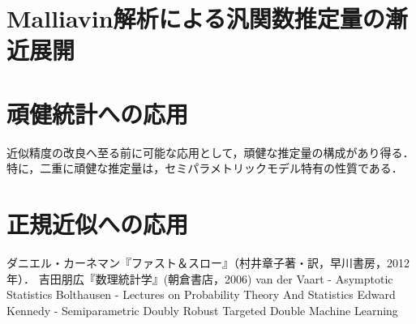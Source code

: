 \documentclass[uplatex, dvipdfmx]{jsarticle}
\begin{document}
\section{Malliavin解析による汎関数推定量の漸近展開}

\section{頑健統計への応用}

\begin{tcolorbox}[colframe=ForestGreen, colback=ForestGreen!10!white,breakable,colbacktitle=ForestGreen!40!white,coltitle=black,fonttitle=\bfseries\sffamily,
title=]
    近似精度の改良へ至る前に可能な応用として，頑健な推定量の構成があり得る．特に，二重に頑健な推定量は，セミパラメトリックモデル特有の性質である．
\end{tcolorbox}

\section{正規近似への応用}

\begin{thebibliography}{99}
    ダニエル・カーネマン『ファスト＆スロー』（村井章子著・訳，早川書房，2012年）．
    吉田朋広『数理統計学』(朝倉書店，2006)
    van der Vaart - Asymptotic Statistics
    Bolthausen - Lectures on Probability Theory And Statistics
    Edward Kennedy - Semiparametric Doubly Robust Targeted Double Machine Learning
\end{thebibliography}
\end{document}
